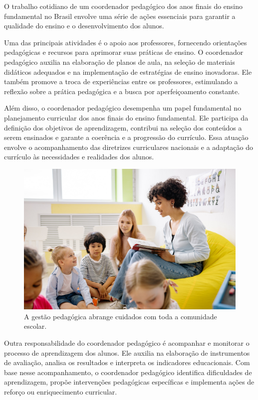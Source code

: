 O trabalho cotidiano de um coordenador pedagógico dos anos finais do ensino fundamental no Brasil envolve uma série de ações essenciais para garantir a qualidade do ensino e o desenvolvimento dos alunos.

Uma das principais atividades é o apoio aos professores, fornecendo orientações pedagógicas e recursos para aprimorar suas práticas de ensino. O coordenador pedagógico auxilia na elaboração de planos de aula, na seleção de materiais didáticos adequados e na implementação de estratégias de ensino inovadoras. Ele também promove a troca de experiências entre os professores, estimulando a reflexão sobre a prática pedagógica e a busca por aperfeiçoamento constante.

Além disso, o coordenador pedagógico desempenha um papel fundamental no planejamento curricular dos anos finais do ensino fundamental. Ele participa da definição dos objetivos de aprendizagem, contribui na seleção dos conteúdos a serem ensinados e garante a coerência e a progressão do currículo. Essa atuação envolve o acompanhamento das diretrizes curriculares nacionais e a adaptação do currículo às necessidades e realidades dos alunos.

\begin{figure}
\centering
\includegraphics[width=\textwidth]{./imgs/Imagem003.jpg}
\caption{A gestão pedagógica abrange cuidados com toda a comunidade
escolar.}
\end{figure}

Outra responsabilidade do coordenador pedagógico é acompanhar e monitorar o processo de aprendizagem dos alunos. Ele auxilia na elaboração de instrumentos de avaliação, analisa os resultados e interpreta os indicadores educacionais. Com base nesse acompanhamento, o coordenador pedagógico identifica dificuldades de aprendizagem, propõe intervenções pedagógicas específicas e implementa ações de reforço ou enriquecimento curricular.

